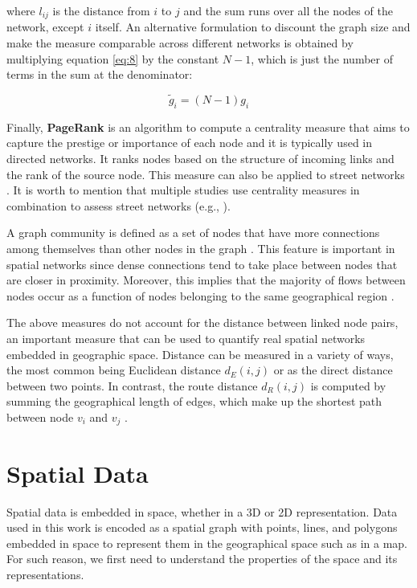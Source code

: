 {{where $l_{ij}$ is the distance from $i$ to $j$ and the sum runs over all the nodes of the network, except $i$ itself. An alternative formulation to discount the graph size and make the measure comparable across different networks is obtained by multiplying equation \ref{eq:8} by the constant $N - 1$, which is just the number of terms in the sum at the denominator:

\begin{equation} \label{eq:9}
\tilde{g}_i = (N - 1)g_i
\end{equation}

Finally, \textbf{PageRank} is an algorithm to compute a centrality measure that aims to capture the prestige or importance of each node and it is typically used in directed networks. It ranks nodes based on the structure of incoming links and the rank of the source node. This measure can also be applied to street networks \cite{jiang_2006, agryzkov_2012, gleich_2014, chin-wen_2015}. It is worth to mention that multiple studies use centrality measures in combination to assess street networks (e.g., \cite{porta_2004, porta_2006, porta_2010, crucitti_urban_2006, crucitti_spatial_2006, sevtsuk_2012}).

A graph community is defined as a set of nodes that have more connections among themselves than other nodes in the graph \cite{fortunato_2010}. This feature is important in spatial networks since dense connections tend to take place between nodes that are closer in proximity. Moreover, this implies that the majority of flows between nodes occur as a function of nodes belonging to the same geographical region \cite{barthelemy_2018}.

The above measures do not account for the distance between linked node pairs, an important measure that can be used to quantify real spatial networks embedded in geographic space. Distance can be measured in a variety of ways, the most common being Euclidean distance $d_E(i, j)$ or as the direct distance between two points. In contrast, the route distance $d_R(i, j)$ is computed by summing the geographical length of edges, which make up the shortest path between node $v_i$ and $v_j$ \cite{anderson_2020}.

\section{Spatial Data}

Spatial data is embedded in space, whether in a 3D or 2D representation. Data used in this work is encoded as a spatial graph with points, lines, and polygons embedded in space to represent them in the geographical space such as in a map. For such reason, we first need to understand the properties of the space and its representations.

}}
